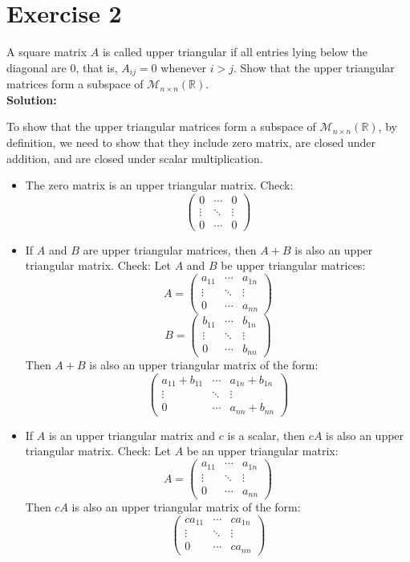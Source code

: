 \documentclass{article}
\begin{document}
\newpage

\section*{Exercise 2}
A square matrix $A$ is called upper triangular if all entries lying below the diagonal are 0, that is, $A_{ij} = 0$ whenever $i > j$. Show that the upper triangular matrices form a subspace of $\mathcal{M}_{n\times n}(\mathbb{R})$. \\

\textbf{Solution:}

To show that the upper triangular matrices form a subspace of $\mathcal{M}_{n\times n}(\mathbb{R})$, by definition, we need to show that they include zero matrix, are closed under addition, and are closed under scalar multiplication.

\begin{itemize}
\item The zero matrix is an upper triangular matrix. Check:
\[
\begin{pmatrix}
0 & \cdots & 0 \\
\vdots & \ddots & \vdots \\
0 & \cdots & 0
\end{pmatrix}
\]
\item If $A$ and $B$ are upper triangular matrices, then $A + B$ is also an upper triangular matrix. Check:
Let $A$ and $B$ be upper triangular matrices:
\[
A = \begin{pmatrix}
a_{11} & \cdots & a_{1n} \\
\vdots & \ddots & \vdots \\
0 & \cdots & a_{nn}
\end{pmatrix}
\]
\[
B = \begin{pmatrix}
b_{11} & \cdots & b_{1n} \\
\vdots & \ddots & \vdots \\
0 & \cdots & b_{nn}
\end{pmatrix}
\]
Then $A + B$ is also an upper triangular matrix of the form:
\[
\begin{pmatrix}
a_{11} + b_{11} & \cdots & a_{1n} + b_{1n} \\
\vdots & \ddots & \vdots \\
0 & \cdots & a_{nn} + b_{nn}
\end{pmatrix}
\]
\item If $A$ is an upper triangular matrix and $c$ is a scalar, then $cA$ is also an upper triangular matrix. Check:
Let $A$ be an upper triangular matrix:
\[
A = \begin{pmatrix}
a_{11} & \cdots & a_{1n} \\
\vdots & \ddots & \vdots \\
0 & \cdots & a_{nn}
\end{pmatrix}
\]
Then $cA$ is also an upper triangular matrix of the form:
\[
\begin{pmatrix}
ca_{11} & \cdots & ca_{1n} \\
\vdots & \ddots & \vdots \\
0 & \cdots & ca_{nn}
\end{pmatrix}
\]
\end{itemize}
\end{document}
